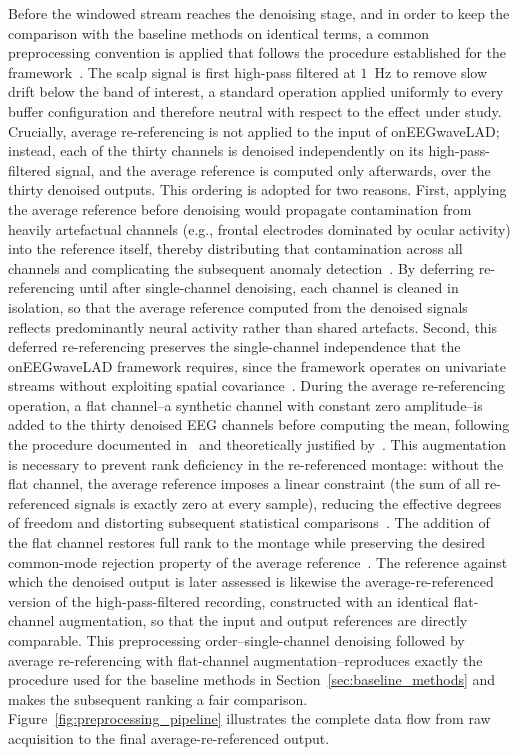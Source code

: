 \documentclass[MScCS,12pt,oneside,final]{uccthesis}
\begin{document}
Before the windowed stream reaches the denoising stage, and in order to keep the comparison with the baseline methods on identical terms, a common preprocessing convention is applied that follows the procedure established for the framework~\parencite{longo2025oneegwavelad, longo2026framework}. The scalp signal is first high-pass filtered at $1$~Hz to remove slow drift below the band of interest, a standard operation applied uniformly to every buffer configuration and therefore neutral with respect to the effect under study. Crucially, average re-referencing is not applied to the input of onEEGwaveLAD; instead, each of the thirty channels is denoised independently on its high-pass-filtered signal, and the average reference is computed only afterwards, over the thirty denoised outputs. This ordering is adopted for two reasons. First, applying the average reference before denoising would propagate contamination from heavily artefactual channels (e.g., frontal electrodes dominated by ocular activity) into the reference itself, thereby distributing that contamination across all channels and complicating the subsequent anomaly detection~\parencite{yao2005comparative}. By deferring re-referencing until after single-channel denoising, each channel is cleaned in isolation, so that the average reference computed from the denoised signals reflects predominantly neural activity rather than shared artefacts. Second, this deferred re-referencing preserves the single-channel independence that the onEEGwaveLAD framework requires, since the framework operates on univariate streams without exploiting spatial covariance~\parencite{longo2025oneegwavelad}. During the average re-referencing operation, a flat channel--a synthetic channel with constant zero amplitude--is added to the thirty denoised EEG channels before computing the mean, following the procedure documented in~\textcite{miyakoshi_makoto_pipeline} and theoretically justified by~\textcite{bertrand1985theoretical}. This augmentation is necessary to prevent rank deficiency in the re-referenced montage: without the flat channel, the average reference imposes a linear constraint (the sum of all re-referenced signals is exactly zero at every sample), reducing the effective degrees of freedom and distorting subsequent statistical comparisons~\parencite{bigdely2015prep}. The addition of the flat channel restores full rank to the montage while preserving the desired common-mode rejection property of the average reference~\parencite{nunez2006electric}. The reference against which the denoised output is later assessed is likewise the average-re-referenced version of the high-pass-filtered recording, constructed with an identical flat-channel augmentation, so that the input and output references are directly comparable. This preprocessing order--single-channel denoising followed by average re-referencing with flat-channel augmentation--reproduces exactly the procedure used for the baseline methods in Section~\ref{sec:baseline_methods} and makes the subsequent ranking a fair comparison. Figure~\ref{fig:preprocessing_pipeline} illustrates the complete data flow from raw acquisition to the final average-re-referenced output.
\end{document}
